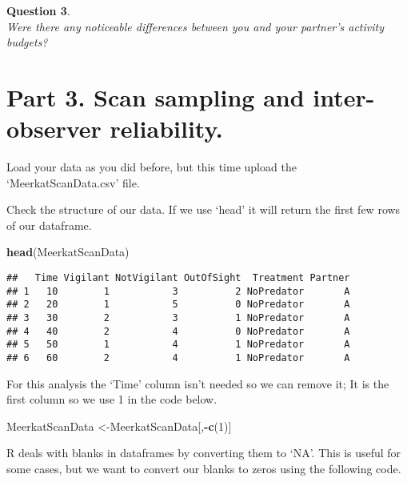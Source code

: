 \documentclass[]{book}
\newenvironment{Shaded}{\begin{snugshade}}{\end{snugshade}}
\newcommand{\DecValTok}[1]{\textcolor[rgb]{0.00,0.00,0.81}{#1}}
\newcommand{\KeywordTok}[1]{\textcolor[rgb]{0.13,0.29,0.53}{\textbf{#1}}}
\newcommand{\NormalTok}[1]{#1}
\newcommand{\OperatorTok}[1]{\textcolor[rgb]{0.81,0.36,0.00}{\textbf{#1}}}
\begin{document}
\textbf{Question 3}.\\
\emph{Were there any noticeable differences between you and your partner's activity budgets?}

\hypertarget{part-3.-scan-sampling-and-inter-observer-reliability.}{%
\section*{Part 3. Scan sampling and inter-observer reliability.}\label{part-3.-scan-sampling-and-inter-observer-reliability.}}

Load your data as you did before, but this time upload the `MeerkatScanData.csv' file.

Check the structure of our data. If we use `head' it will return the first few rows of our dataframe.

\begin{Shaded}
\begin{Highlighting}[]
\KeywordTok{head}\NormalTok{(MeerkatScanData)}
\end{Highlighting}
\end{Shaded}

\begin{verbatim}
##   Time Vigilant NotVigilant OutOfSight  Treatment Partner
## 1   10        1           3          2 NoPredator       A
## 2   20        1           5          0 NoPredator       A
## 3   30        2           3          1 NoPredator       A
## 4   40        2           4          0 NoPredator       A
## 5   50        1           4          1 NoPredator       A
## 6   60        2           4          1 NoPredator       A
\end{verbatim}

For this analysis the `Time' column isn't needed so we can remove it; It is the first column so we use 1 in the code below.

\begin{Shaded}
\begin{Highlighting}[]
\NormalTok{MeerkatScanData <-MeerkatScanData[,}\OperatorTok{-}\KeywordTok{c}\NormalTok{(}\DecValTok{1}\NormalTok{)]}
\end{Highlighting}
\end{Shaded}

R deals with blanks in dataframes by converting them to `NA'. This is useful for some cases, but we want to convert our blanks to zeros using the following code.
\end{document}
